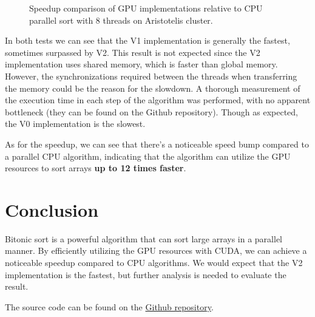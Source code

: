 \documentclass{article}
\begin{document}
\begin{figure}[H]
    \caption{Speedup comparison of GPU implementations relative to CPU parallel sort with 8 threads on Aristotelis cluster.}
    \label{fig:speedup-performance-p100}
\end{figure}

In both tests we can see that the V1 implementation is generally the fastest, sometimes surpassed by V2. This result is not
expected since the V2 implementation uses shared memory, which is faster than global memory. However, the synchronizations required
between the threads when transferring the memory could be the reason for the slowdown. A thorough measurement of the execution time 
in each step of the algorithm was performed, with no apparent bottleneck (they can be found on the Github repository). 
Though as expected, the V0 implementation is the slowest.

As for the speedup, we can see that there's a noticeable speed bump compared to a parallel CPU algorithm, indicating that the algorithm
can utilize the GPU resources to sort arrays \textbf{up to 12 times faster}.

\section{Conclusion}
Bitonic sort is a powerful algorithm that can sort large arrays in a parallel manner. By efficiently utilizing the GPU resources
with CUDA, we can achieve a noticeable speedup compared to CPU algorithms. We would expect that the V2 implementation is the fastest,
but further analysis is needed to evaluate the result.

The source code can be found on the \href{https://github.com/NontasBak/CUDA-bitonic-sort}{Github repository}.
\end{document}
